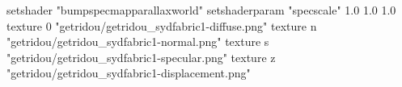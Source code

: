 setshader "bumpspecmapparallaxworld"
setshaderparam "specscale" 1.0 1.0 1.0
texture 0 "getridou/getridou_sydfabric1-diffuse.png"
texture n "getridou/getridou_sydfabric1-normal.png"
texture s "getridou/getridou_sydfabric1-specular.png"
texture z "getridou/getridou_sydfabric1-displacement.png"

